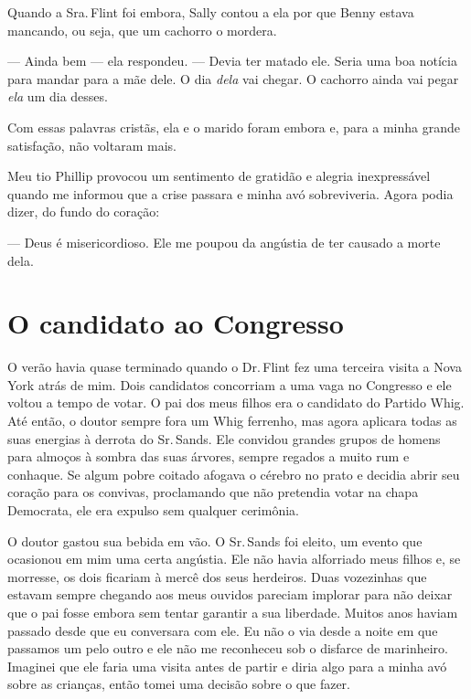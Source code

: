 Quando a Sra.\,Flint foi embora, Sally
contou a ela por que Benny estava mancando, ou seja, que um cachorro o
mordera.

--- Ainda bem --- ela respondeu. --- Devia ter matado ele. Seria uma boa
notícia para mandar para a mãe dele. O dia \emph{dela} vai chegar. O
cachorro ainda vai pegar \emph{ela} um dia desses.

Com essas palavras cristãs, ela e o marido foram embora e, para a minha
grande satisfação, não voltaram mais.

Meu tio Phillip provocou um sentimento
de gratidão e alegria inexpressável quando me informou que a crise
passara e minha avó sobreviveria. Agora podia dizer, do fundo do
coração:

--- Deus é misericordioso. Ele me poupou da angústia de ter causado a
morte dela.

\chapter*{O candidato ao Congresso}

O verão havia quase terminado quando o
Dr.\,Flint fez uma terceira visita a Nova York atrás de mim. Dois
candidatos concorriam a uma vaga no Congresso e ele voltou a tempo de
votar. O pai dos meus filhos era o candidato do Partido Whig. Até então,
o doutor sempre fora um Whig ferrenho, mas agora aplicara todas as suas
energias à derrota do Sr.\,Sands. Ele convidou grandes grupos de homens
para almoços à sombra das suas árvores, sempre regados a muito rum e
conhaque. Se algum pobre coitado afogava o cérebro no prato e decidia
abrir seu coração para os convivas, proclamando que não pretendia votar
na chapa Democrata, ele era expulso sem qualquer cerimônia.

O doutor gastou sua bebida em vão. O
Sr.\,Sands foi eleito, um evento que ocasionou em mim uma certa angústia.
Ele não havia alforriado meus filhos e, se morresse, os dois ficariam à
mercê dos seus herdeiros. Duas vozezinhas que estavam sempre chegando
aos meus ouvidos pareciam implorar para não deixar que o pai fosse
embora sem tentar garantir a sua liberdade. Muitos anos haviam passado
desde que eu conversara com ele. Eu não o via desde a noite em que
passamos um pelo outro e ele não me reconheceu sob o disfarce de
marinheiro. Imaginei que ele faria uma visita antes de partir e diria
algo para a minha avó sobre as crianças, então tomei uma decisão sobre o
que fazer.

